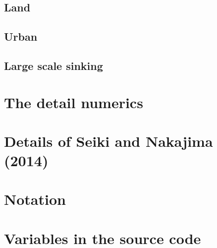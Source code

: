 \documentclass[a4paper]{report}
\begin{document}
\section{Land} \label{sec:land}


\section{Urban}


%

\section{Large scale sinking}





\appendix
\chapter{The detail numerics}



\chapter{Details of Seiki and Nakajima (2014)}
\label{app:sn14}


\chapter{Notation}


\chapter{Variables in the source code}

\end{document}
